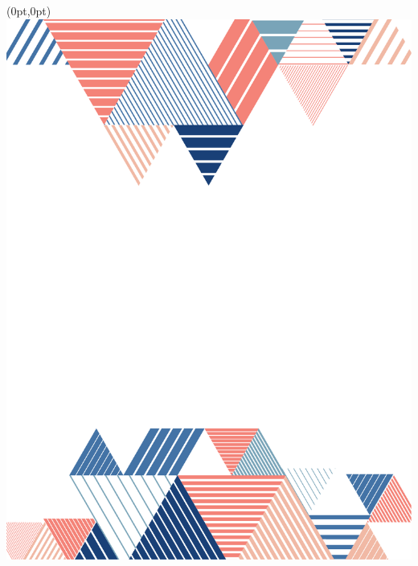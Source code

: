 



\setmainfont{Free Sans}  %

\begingroup\thispagestyle{empty}

\begin{textblock*}{2.625in}(0pt,0pt)%
\vspace*{-3cm}
\hspace*{-4cm}\includegraphics[scale=1]{../watermarks/front9ano.pdf}
\end{textblock*}
                
